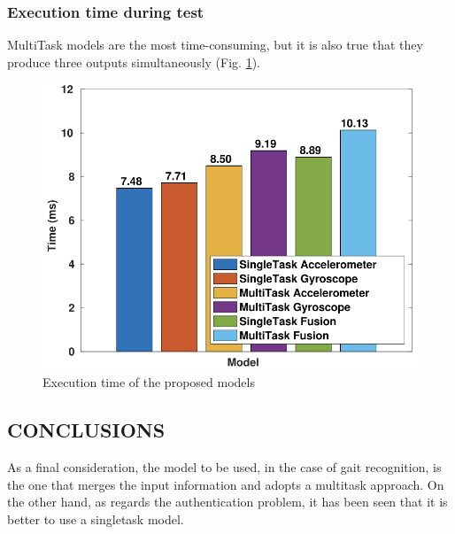 \subsubsection{Execution time during test}
MultiTask models are the most time-consuming, but it is also true that they 
produce three outputs simultaneously (Fig. \ref{fig:time}).
\begin{figure}[htbp]
    \centering
    \includegraphics[width = 0.6 \linewidth]{images/paper5/time.png}
    \centering
    \caption{Execution time of the proposed models}
    \label{fig:time}
\end{figure}

\subsection{CONCLUSIONS}
As a final consideration, the model to be used, in the case of gait recognition, 
is the one that merges the input information and adopts a multitask 
approach. On the other hand, as regards the authentication problem, it has 
been seen that it is better to use a singletask model.